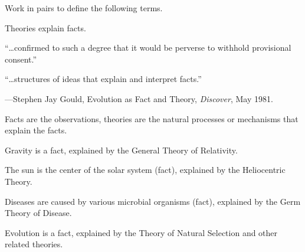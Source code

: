 \documentclass[t]{beamer}
\begin{document}
\begin{frame}[t,plain]{Work in pairs to define the following terms.}
	\vspace{2ex}

	\hangpara{}

	\hangpara{}

	\hangpara{}
	
	\hangpara{}

\end{frame}
%
{
\begin{frame}[t]{Theories explain facts.}


	\hangpara{} “\ldots confirmed to such a degree that it would be perverse to withhold provisional consent.”
	
	\hangpara{} “\ldots structures of ideas that explain and interpret facts.”
	
	\hangpara\hspace*{60mm}\parbox[t]{2in}{\raggedright —Stephen Jay Gould, Evolution as Fact and Theory, \textit{Discover}, May 1981.}

\end{frame}
}

%
\begin{frame}[t]{Facts are the observations, theories are the natural processes or mechanisms that explain the facts.}


	\hangpara Gravity is a fact, explained by the General Theory of Relativity.
	\pause

	\hangpara The sun is the center of the solar system (fact), explained by the Heliocentric Theory.
	\pause
		
	\hangpara Diseases are caused by various microbial organisms (fact), explained by the Germ Theory of Disease.
	\pause

	\hangpara Evolution is a fact, explained by the Theory of Natural Selection and other related theories.

\end{frame}
\end{document}
